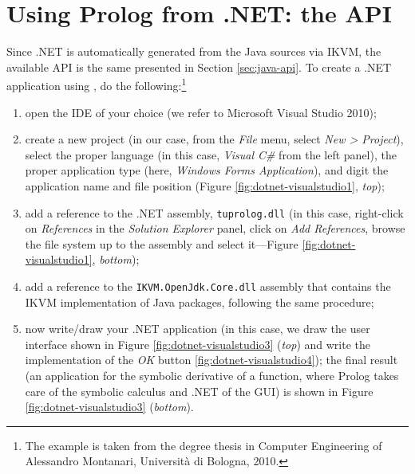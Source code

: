 \section{Using Prolog from .NET: the API}
\label{sec:dotnet-oo-api}

Since \tuprolog{}.NET is automatically generated from the Java sources via IKVM, the available API is the same presented in Section \ref{sec:java-api}.
%
To create a .NET application using \tuprolog{}, do the following:\footnote{The example is taken from the degree thesis in Computer Engineering of Alessandro Montanari, Universit\`{a} di Bologna, 2010.}

\begin{enumerate}
  \item open the IDE of your choice (we refer to Microsoft Visual Studio 2010);
  \item create a new project (in our case, from the \textit{File} menu, select \textit{New > Project}), select the proper language (in this case, \textit{Visual C\#} from the left panel), the proper application type (here, \textit{Windows Forms Application}), and digit the application name and file position (Figure \ref{fig:dotnet-visualstudio1}, \textit{top});
  \item add a reference to the \tuprolog{}.NET assembly, \texttt{tuprolog.dll} (in this case, right-click on \textit{References} in the \textit{Solution Explorer} panel, click on \textit{Add References}, browse the file system up to the assembly and select it---Figure \ref{fig:dotnet-visualstudio1}, \textit{bottom});
  \item add a reference to the \texttt{IKVM.OpenJdk.Core.dll} assembly that contains the IKVM implementation of Java packages, following the same procedure;
  \item now write/draw your .NET application (in this case, we draw the user interface shown in Figure \ref{fig:dotnet-visualstudio3} (\textit{top}) and write the implementation of the \textit{OK} button \ref{fig:dotnet-visualstudio4}); the final result (an application for the symbolic derivative of a function, where Prolog takes care of the symbolic calculus and .NET of the GUI) is shown in Figure \ref{fig:dotnet-visualstudio3} (\textit{bottom}).
\end{enumerate}

